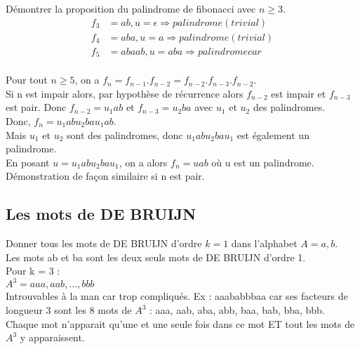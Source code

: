 \documentclass[11pt,a4paper]{article}
\begin{document}
	Démontrer la proposition du palindrome de fibonacci avec $n \geq 3$.\\
	\begin{align*}
		f_3 &= ab, u = \epsilon \Rightarrow palindrome (trivial)\\
		f_4 &= aba, u = a \Rightarrow palindrome (trivial)\\
		f_5 &= abaab, u = aba \Rightarrow palindrome car \\
	\end{align*}
	
	Pour tout $n \geq 5$, on a $f_n = f_{n-1} . f_{n-2} = f_{n-2} . f_{n-3} . f_{n-2}$.\\
	
	Si n est impair alors, par hypothèse de récurrence alors $f_{n-2}$ est impair et $f_{n-3}$ est pair. Donc $f_{n-2} = u_1ab$ et $f_{n-3} = u_2ba$ avec $u_1$ et $u_2$ des palindromes.\\
	Donc, $f_n = u_1abu_2bau_1ab$.\\
	Mais $u_1$ et $u_2$ sont des palindromes, donc $u_1abu_2bau_1$ est également un palindrome.\\
	En posant $u = u_1abu_2bau_1$, on a alors $f_n = uab$ où u est un palindrome.\\
	
	Démonstration de façon similaire si n est pair.
	
	\subsection{Les mots de DE BRUIJN}
	
	Donner tous les mots de DE BRUIJN d'ordre $k = 1$ dans l'alphabet $A = {a,b}$.\\
	Les mots ab et ba sont les deux seuls mots de DE BRUIJN d'ordre 1.\\
	
	Pour k = 3 :\\
	$A^3 = {aaa, aab, ..., bbb}$\\
	Introuvables à la man car trop compliqués. Ex : aaababbbaa car ses facteurs de longueur 3 sont les 8 mots de $A^3$ : aaa, aab, aba, abb, baa, bab, bba, bbb. Chaque mot n'apparait qu'une et une seule fois dans ce mot ET tout les mots de $A^3$ y apparaissent.
	
\end{document}
